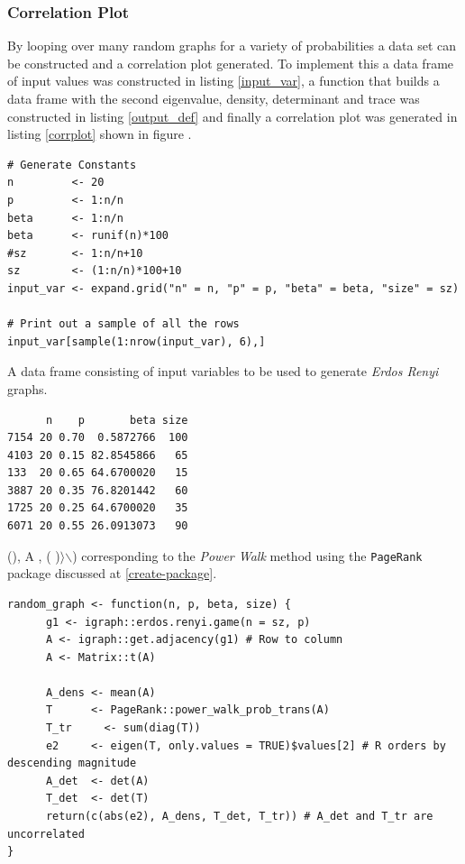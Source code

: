 \documentclass[11pt]{article}
\begin{document}
\subsubsection{Correlation Plot}
\label{sec:org13f7d4f}

By looping over many random graphs for a variety of probabilities a data set can
be constructed and a correlation plot generated. To implement this a data frame
of input values was constructed in listing \ref{input_var}, a function that builds a
data frame with the second eigenvalue, density, determinant and trace was constructed in listing \ref{output_def} and finally a correlation plot was generated in listing \ref{corrplot} shown in figure .


\begin{listing}[htbp]
\begin{verbatim}
# Generate Constants
n         <- 20
p         <- 1:n/n
beta      <- 1:n/n
beta      <- runif(n)*100
#sz       <- 1:n/n+10
sz        <- (1:n/n)*100+10
input_var <- expand.grid("n" = n, "p" = p, "beta" = beta, "size" = sz)

# Print out a sample of all the rows
input_var[sample(1:nrow(input_var), 6),]
\end{verbatim}
\caption{\label{input_var}A data frame consisting of input variables to be used to generate \emph{Erdos Renyi} graphs.}
\end{listing}

\begin{verbatim}
      n    p       beta size
7154 20 0.70  0.5872766  100
4103 20 0.15 82.8545866   65
133  20 0.65 64.6700020   15
3887 20 0.35 76.8201442   60
1725 20 0.25 64.6700020   35
6071 20 0.55 26.0913073   90
\end{verbatim}


\left(\right), \left\lvert A \right\rvert,
\left(  \right)\right\(\rangle\)$\backslash$) corresponding to the \emph{Power Walk} method using the \texttt{PageRank} package discussed at \ref{create-package}.
\begin{verbatim}
random_graph <- function(n, p, beta, size) {
      g1 <- igraph::erdos.renyi.game(n = sz, p)
      A <- igraph::get.adjacency(g1) # Row to column
      A <- Matrix::t(A)

      A_dens <- mean(A)
      T      <- PageRank::power_walk_prob_trans(A)
      T_tr     <- sum(diag(T))
      e2     <- eigen(T, only.values = TRUE)$values[2] # R orders by descending magnitude
      A_det  <- det(A)
      T_det  <- det(T)
      return(c(abs(e2), A_dens, T_det, T_tr)) # A_det and T_tr are uncorrelated
}
\end{verbatim}
\end{document}
